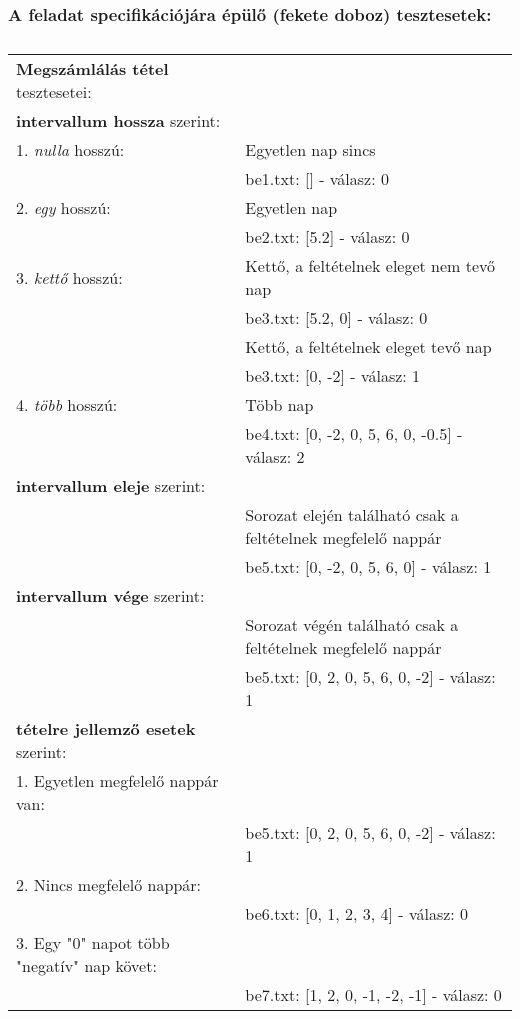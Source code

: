 \documentclass[a4paper]{article}
\begin{document}
      \subsubsection{A feladat specifikációjára épülő (fekete doboz) tesztesetek:}
      \begin{table}[H]
        \caption*{}
        \begin{tabular*}{\textwidth}{ll}
          \toprule
          \textbf{Megszámlálás tétel} tesztesetei: & \\
          \textbf{intervallum hossza} szerint: & \\
          1. \textit{nulla} hosszú: & Egyetlen nap sincs \\
          & \quad be1.txt: [] - válasz: 0 \\
          2. \textit{egy} hosszú: & Egyetlen nap \\
          & \quad be2.txt: [5.2] - válasz: 0 \\
          3. \textit{kettő} hosszú: & Kettő, a feltételnek eleget nem tevő nap \\
          & \quad be3.txt: [5.2, 0] - válasz: 0 \\
          & Kettő, a feltételnek eleget tevő nap \\
          & \quad be3.txt: [0, -2] - válasz: 1 \\
          4. \textit{több} hosszú: & Több nap \\
          & \quad be4.txt: [0, -2, 0, 5, 6, 0, -0.5] - válasz: 2 \\
          \textbf{intervallum eleje} szerint: & \\
          & Sorozat elején található csak a feltételnek megfelelő nappár \\
          & \quad be5.txt: [0, -2, 0, 5, 6, 0] - válasz: 1 \\
          \textbf{intervallum vége} szerint: & \\
          & Sorozat végén található csak a feltételnek megfelelő nappár \\
          & \quad be5.txt: [0, 2, 0, 5, 6, 0, -2] - válasz: 1 \\
          \textbf{tételre jellemző esetek} szerint: & \\
          1. Egyetlen megfelelő nappár van: & \\
          & \quad be5.txt: [0, 2, 0, 5, 6, 0, -2] - válasz: 1 \\
          2. Nincs megfelelő nappár: & \\
          & \quad be6.txt: [0, 1, 2, 3, 4] - válasz: 0 \\
          3. Egy "0" napot több "negatív" nap követ: & \\
          & \quad be7.txt: [1, 2, 0, -1, -2, -1] - válasz: 0 \\
          \bottomrule
        \end{tabular*}
      \end{table}
\end{document}
